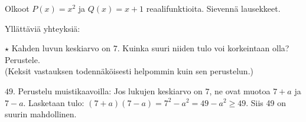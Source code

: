 \begin{tehtavasivu}
\begin{tehtava}
    Olkoot $P(x)=x^2$ ja $Q(x)=x+1$ reaalifunktioita. Sievennä lausekkeet.
    \begin{alakohdat}
    \end{alakohdat}
    \begin{vastaus}
        \begin{alakohdat}
        \end{alakohdat}
    \end{vastaus}
\end{tehtava}

\begin{tehtava} 
	Yllättäviä yhteyksiä:
    \begin{alakohdat}
    \end{alakohdat}

    \begin{vastaus}
    \begin{alakohdat}
    \end{alakohdat}
    \end{vastaus}
\end{tehtava}

\begin{tehtava} %
    $\star$ Kahden luvun keskiarvo on $7$. Kuinka suuri niiden tulo voi korkeintaan olla? Perustele.
    \\ (Keksit vastauksen todennäköisesti helpommin kuin sen perustelun.)
    \begin{vastaus}
        $49$. Perustelu muistikaavoilla: Jos lukujen keskiarvo on $7$, ne ovat muotoa $7+a$ ja $7-a$. Lasketaan tulo: $(7+a)(7-a)=7^2-a^2 = 49-a^2 \geq 49$. Siis 49 on suurin
        mahdollinen.
    \end{vastaus}
\end{tehtava}

\end{tehtavasivu}